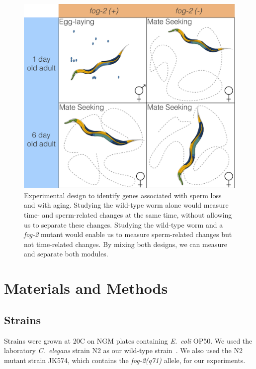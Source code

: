 \documentclass[10pt,letterpaper,twocolumn]{article}
\newcommand{\cel}{\emph{C.~elegans}}
\newcommand{\fog}{\emph{\mbox{fog-2}}}
\newcommand{\ecol}{\emph{E.~coli}}
\begin{document}
\begin{figure}[htbp]
\renewcommand{\familydefault}{\sfdefault}\normalfont{}
\centering
\captionsetup{width=\linewidth}
\includegraphics[width=\linewidth]{../output/figs/final_figs/worm_life_fog2_vs_n2.pdf}
\caption{Experimental design to identify genes associated with sperm loss and
with aging. Studying the wild-type worm alone would measure time- and
sperm-related changes at the same time, without allowing us to separate these
changes. Studying the wild-type worm and a \fog{} mutant would enable us to
measure sperm-related changes but not time-related changes. By mixing both
designs, we can measure and separate both modules.
}%
\label{fig:wormlife}
\end{figure}

\section*{Materials and Methods}
\label{sec:materials_methods}

\subsection*{Strains}
\label{sub:Strains}
Strains were grown at 20\degree{}C on NGM plates containing \ecol{} OP50. We
used the laboratory \cel{} strain N2 as our wild-type strain~\cite{Brenner1974}.
We also used the N2 mutant strain JK574, which contains the \fog{}\emph{(q71)}
allele, for our experiments.
\end{document}
